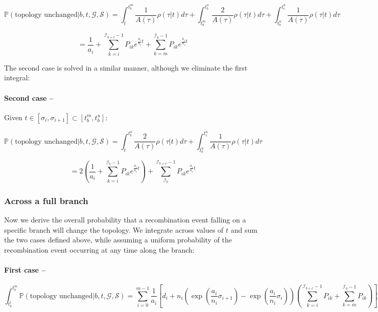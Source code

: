 \documentclass[11pt]{article}
\begin{document}
\begin{equation*}
	\mathbb{P}(\textrm{topology unchanged} | b,t,\mathcal{G},\mathcal{S}) = \int_{t}^{t_b^m}\frac{1}{A(\tau)}\rho(\tau|t)d\tau + \int_{t_b^m}^{t_b^u}\frac{2}{A(\tau)}\rho(\tau|t)d\tau + \int_{t_b^u}^{t_c^u}\frac{1}{A(\tau)}\rho(\tau|t)d\tau
\end{equation*}

\begin{equation}
	= \frac{1}{a_i} + \sum_{k=i}^{\mathcal{I}_{b+c}-1}P_{ik}e^{\frac{a_i}{n_i}t} + \sum_{k=m}^{\mathcal{I}_b-1}P_{ik}e^{\frac{a_i}{n_i}t}
\end{equation}

The second case is solved in a similar manner, although we eliminate the first integral:

\paragraph{Second case --} Given $t \in [\sigma_i, \sigma_{i+1}] \subset [t_b^m,t_b^u]$:

\begin{equation*}
	\mathbb{P}(\textrm{topology unchanged} | b,t,\mathcal{G},\mathcal{S}) = \int_{t}^{t_b^u}\frac{2}{A(\tau)}\rho(\tau|t)d\tau + \int_{t_b^u}^{t_c^u}\frac{1}{A(\tau)}\rho(\tau|t)d\tau
\end{equation*}

\begin{equation}
	= 2\left(\frac{1}{a_i} + \sum_{k=i}^{\mathcal{I}_{b}-1}P_{ik}e^{\frac{a_i}{n_i}t}\right) + \sum_{\mathcal{I}_b}^{\mathcal{I}_{b+c}-1}P_{ik}e^{\frac{a_i}{n_i}t}
\end{equation}

\subsubsection{Across a full branch}

Now we derive the overall probability that a recombination event falling on a specific branch will change the topology. We integrate across values of $t$ and sum the two cases defined above, while assuming a uniform probability of the recombination event occurring at any time along the branch:

\paragraph{First case --}

\begin{equation}
	\int_{t_b^l}^{t_b^m}{\mathbb{P}(\textrm{topology unchanged} | b,t,\mathcal{G},\mathcal{S})}=\sum_{i=0}^{m-1}\frac{1}{a_i}\left[d_i+n_i\left(\exp\left(\frac{a_i}{n_i}\sigma_{i+1}\right)-\exp\left(\frac{a_i}{n_i}\sigma_i\right)\right)\left(\sum_{k=i}^{\mathcal{I}_{b+c}-1}P_{ik}+\sum_{k=m}^{\mathcal{I}_b-1}P_{ik}\right)\right]
\end{equation}
\end{document}
